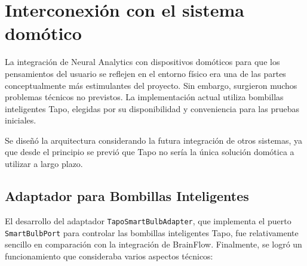 \section{Interconexión con el sistema domótico}

La integración de Neural Analytics con dispositivos domóticos para que los pensamientos del usuario se reflejen en el entorno físico era una de las partes conceptualmente más estimulantes del proyecto. Sin embargo, surgieron muchos problemas técnicos no previstos. La implementación actual utiliza bombillas inteligentes Tapo, elegidas por su disponibilidad y conveniencia para las pruebas iniciales.

Se diseñó la arquitectura considerando la futura integración de otros sistemas, ya que desde el principio se previó que Tapo no sería la única solución domótica a utilizar a largo plazo.

\subsection{Adaptador para Bombillas Inteligentes}

El desarrollo del adaptador \texttt{TapoSmartBulbAdapter}, que implementa el puerto \texttt{SmartBulbPort} para controlar las bombillas inteligentes Tapo, fue relativamente sencillo en comparación con la integración de BrainFlow. Finalmente, se logró un funcionamiento que consideraba varios aspectos técnicos:

